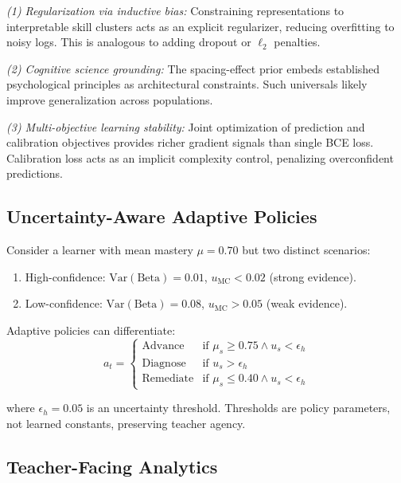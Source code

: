 \documentclass[preprint,12pt]{elsarticle}
\begin{document}
\textit{(1) Regularization via inductive bias:} Constraining representations to interpretable skill clusters acts as an explicit regularizer, reducing overfitting to noisy logs. This is analogous to adding dropout or $\ell_2$ penalties.

\textit{(2) Cognitive science grounding:} The spacing-effect prior embeds established psychological principles as architectural constraints. Such universals likely improve generalization across populations.

\textit{(3) Multi-objective learning stability:} Joint optimization of prediction and calibration objectives provides richer gradient signals than single BCE loss. Calibration loss acts as an implicit complexity control, penalizing overconfident predictions.

\subsection{Uncertainty-Aware Adaptive Policies}

Consider a learner with mean mastery $\mu = 0.70$ but two distinct scenarios:

\begin{enumerate}
\item High-confidence: $\text{Var}(\text{Beta}) = 0.01$, $u_{\text{MC}} < 0.02$ (strong evidence).
\item Low-confidence: $\text{Var}(\text{Beta}) = 0.08$, $u_{\text{MC}} > 0.05$ (weak evidence).
\end{enumerate}

Adaptive policies can differentiate:
\begin{equation}
a_t = \begin{cases}
\text{Advance} & \text{if } \mu_s \geq 0.75 \land u_s < \epsilon_h\\
\text{Diagnose} & \text{if } u_s > \epsilon_h\\
\text{Remediate} & \text{if } \mu_s \leq 0.40 \land u_s < \epsilon_h
\end{cases}
\end{equation}

where $\epsilon_h = 0.05$ is an uncertainty threshold. Thresholds are policy parameters, not learned constants, preserving teacher agency.

\subsection{Teacher-Facing Analytics}
\end{document}
